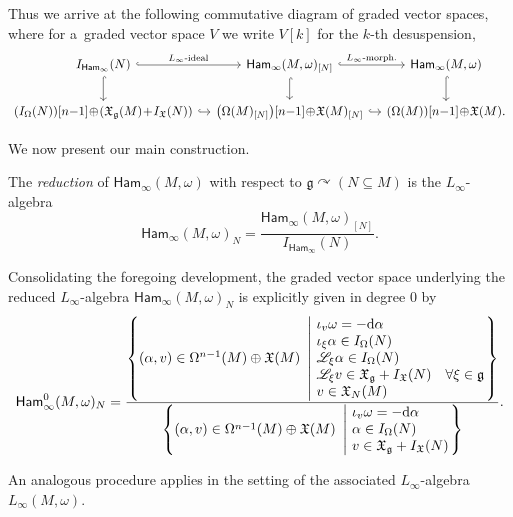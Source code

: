 \documentclass[pdftex]{sigma}
\numberwithin{equation}{section}
\newcommand{\g}{\mathfrak{g}}
\newcommand{\Ham}{\mathsf{Ham}}
\newcommand{\fgmodule}{\mathfrak{X}_{\g}}
\newcommand{\vanvf}{I_{\mathfrak{X}}(N)}%
\renewcommand{\L}{\mathscr{L}}
\newcommand{\X}{\mathfrak{X}}
\renewcommand{\subset}{\subseteq}
\renewcommand{\d}{\mathrm{d}}
\begin{document}
Thus we arrive at the following commutative diagram of graded vector spaces, where for a~graded vector space $V$ we write $V[k]$ for the $k$-th desuspension,
\[
	\begin{tikzcd}[column sep =1.0em]
		I_{\Ham_\infty}(N) \ar[r,hook,"L_\infty\text{-ideal}"] \ar[d,hook]&
		\Ham_\infty(M,\omega)_{[N]} \ar[r,hook,"L_\infty\text{-morph.}"] \ar[d,hook] &
		\Ham_\infty(M,\omega) \ar[d,hook]
		\\
		 (I_\Omega(N) ){[n{-}1]}\!\oplus\! (\fgmodule(M)\!+\!\vanvf ) \ar[r,hook]&
		 \bigl(\Omega(M)_{[N]} \bigr){[n{-}1]}\!\oplus\! \X(M)_{[N]} \ar[r,hook]&
		 (\Omega(M) ){[n{-}1]}\!\oplus\! \X(M).
	\end{tikzcd}
\]

We now present our main construction.

\begin{Definition}\label{def:LinftyReductions}
	The \emph{reduction} of $\Ham_\infty(M,\omega)$ with respect to $\g\curvearrowright (N\subset M)$ is the $L_\infty$-algebra
	\[
		\Ham_\infty(M,\omega)_N = \frac{\Ham_\infty(M,\omega)_{[N]}}{I_{\Ham_\infty}(N)}.
	\]
\end{Definition}

Consolidating the foregoing development, the graded vector space underlying the reduced $L_\infty$-algebra $\Ham_\infty(M,\omega)_N$ is explicitly given in degree $0$
by
\[
	\Ham_\infty^0(M,\omega)_N =
	\frac{
		\left\lbrace
			(\alpha,v) \in \Omega^{n{-}1}(M) \oplus\X(M)
		~\left\vert~
			\begin{array}{@{}l@{}}
				\iota_v \omega = -\d \alpha
				\\
				\iota_\xi \alpha \in I_{\Omega}(N)
				\\
				\L_\xi\alpha \in I_{\Omega}(N)
				\\
				\L_\xi v \in \fgmodule +\vanvf
				\quad\forall \xi \in \g
				\\
				v \in \X_N(M)
			\end{array}
		\right.
		\right\rbrace
	}{
		\left\lbrace
			(\alpha,v) \in \Omega^{n{-}1}(M)\oplus\X(M)
		~\left\vert~
			\begin{array}{@{}l@{}}
				\iota_v \omega = -\d \alpha
				\\
				\alpha \in I_{\Omega}(N)
				\\
				v \in \fgmodule +\vanvf
			\end{array}
		\right.
		\right\rbrace
	}.
\]

An analogous procedure applies in the setting of the associated $L_\infty$-algebra $L_\infty(M,\omega)$.
\end{document}
